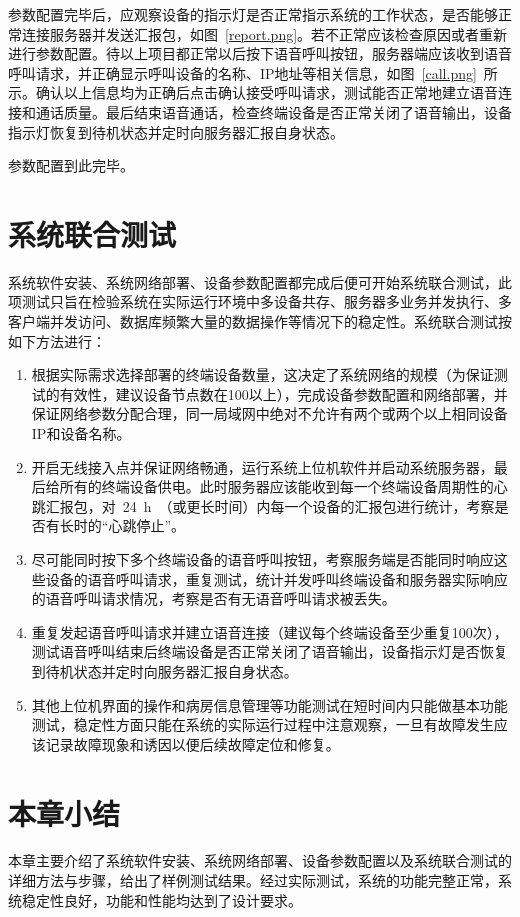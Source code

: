参数配置完毕后，应观察设备的指示灯是否正常指示系统的工作状态，是否能够正常连接服务器并发送汇报包，如图~\ref{report.png}。若不正常应该检查原因或者重新进行参数配置。待以上项目都正常以后按下语音呼叫按钮，服务器端应该收到语音呼叫请求，并正确显示呼叫设备的名称、IP地址等相关信息，如图~\ref{call.png}~所示。确认以上信息均为正确后点击确认接受呼叫请求，测试能否正常地建立语音连接和通话质量。最后结束语音通话，检查终端设备是否正常关闭了语音输出，设备指示灯恢复到待机状态并定时向服务器汇报自身状态。

参数配置到此完毕。

\section{系统联合测试}
系统软件安装、系统网络部署、设备参数配置都完成后便可开始系统联合测试，此项测试只旨在检验系统在实际运行环境中多设备共存、服务器多业务并发执行、多客户端并发访问、数据库频繁大量的数据操作等情况下的稳定性。系统联合测试按如下方法进行：
\begin{enumerate}
\item 根据实际需求选择部署的终端设备数量，这决定了系统网络的规模（为保证测试的有效性，建议设备节点数在100以上），完成设备参数配置和网络部署，并保证网络参数分配合理，同一局域网中绝对不允许有两个或两个以上相同设备IP和设备名称。
\item 开启无线接入点并保证网络畅通，运行系统上位机软件并启动系统服务器，最后给所有的终端设备供电。此时服务器应该能收到每一个终端设备周期性的心跳汇报包，对~24~h~（或更长时间）内每一个设备的汇报包进行统计，考察是否有长时的“心跳停止”。
\item 尽可能同时按下多个终端设备的语音呼叫按钮，考察服务端是否能同时响应这些设备的语音呼叫请求，重复测试，统计并发呼叫终端设备和服务器实际响应的语音呼叫请求情况，考察是否有无语音呼叫请求被丢失。
\item 重复发起语音呼叫请求并建立语音连接（建议每个终端设备至少重复100次），测试语音呼叫结束后终端设备是否正常关闭了语音输出，设备指示灯是否恢复到待机状态并定时向服务器汇报自身状态。
\item 其他上位机界面的操作和病房信息管理等功能测试在短时间内只能做基本功能测试，稳定性方面只能在系统的实际运行过程中注意观察，一旦有故障发生应该记录故障现象和诱因以便后续故障定位和修复。
\end{enumerate}

\section{本章小结}
本章主要介绍了系统软件安装、系统网络部署、设备参数配置以及系统联合测试的详细方法与步骤，给出了样例测试结果。经过实际测试，系统的功能完整正常，系统稳定性良好，功能和性能均达到了设计要求。